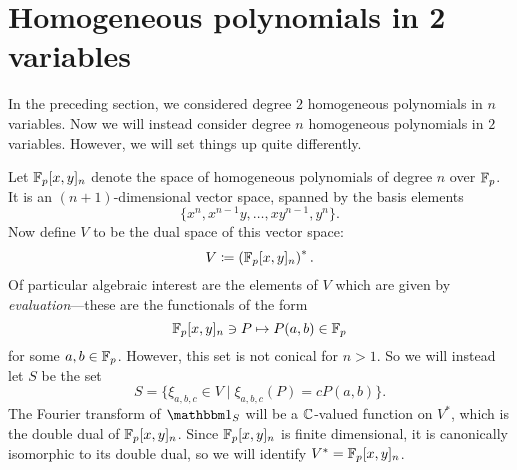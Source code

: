 \section{Homogeneous polynomials in 2 variables}\label{sec:part2}
In the preceding section, we considered degree $2$ homogeneous polynomials in $n$ variables. Now we will instead consider degree $n$ homogeneous polynomials in $2$ variables. However, we will set things up quite differently.

Let $\mathbb{F}_p[x,y]_n$ denote the space of homogeneous polynomials of degree $n$ over $\mathbb{F}_p$. It is an $(n+1)$-dimensional vector space, spanned by the basis elements
\[
	\{x^n, x^{n-1}y, \ldots, xy^{n-1}, y^n\}.
\]
Now define $V$ to be the dual space of this vector space:
\[
	V \coloneqq \left(\mathbb{F}_p[x,y]_n\right)^*.
\]
Of particular algebraic interest are the elements of $V$ which are given by \emph{evaluation}---these are the functionals of the form
\[
	\mathbb{F}_p[x,y]_n \ni P \mapsto P(a,b) \in \mathbb{F}_p
\]
for some $a,b\in \mathbb{F}_p$. However, this set is not conical for $n>1$. So we will instead let $S$ be the set
\[
	S=\{\xi_{a,b,c} \in V \mid \xi_{a,b,c}(P) = cP(a,b)\}.
\]
The Fourier transform of $\IND_S$ will be a $\mathbb{C}$-valued function on $V^*$, which is the double dual of $\mathbb{F}_p[x,y]_n$. Since $\mathbb{F}_p[x,y]_n$ is finite dimensional, it is canonically isomorphic to its double dual, so we will identify $V^* = \mathbb{F}_p[x,y]_n$.